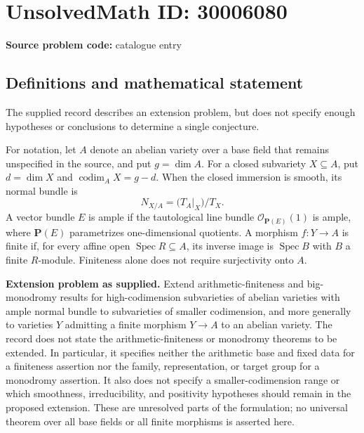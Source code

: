\documentclass[11pt]{article}
\begin{document}
\section*{UnsolvedMath ID: 30006080}
\textbf{Source problem code:} catalogue entry
\subsection{Definitions and mathematical statement}
The supplied record describes an extension problem, but does not specify enough hypotheses or conclusions to determine a single conjecture.

For notation, let \(A\) denote an abelian variety over a base field that remains unspecified in the source, and put \(g=\dim A\). For a closed subvariety \(X\subseteq A\), put \(d=\dim X\) and \(\operatorname{codim}_A X=g-d\). When the closed immersion is smooth, its normal bundle is
\[
N_{X/A}=\bigl(T_A|_X\bigr)/T_X.
\]
A vector bundle \(E\) is ample if the tautological line bundle \(\mathcal O_{\mathbf P(E)}(1)\) is ample, where \(\mathbf P(E)\) parametrizes one-dimensional quotients. A morphism \(f\colon Y\to A\) is finite if, for every affine open \(\operatorname{Spec}R\subseteq A\), its inverse image is \(\operatorname{Spec}B\) with \(B\) a finite \(R\)-module. Finiteness alone does not require surjectivity onto \(A\).

\textbf{Extension problem as supplied.} Extend arithmetic-finiteness and big-monodromy results for high-codimension subvarieties of abelian varieties with ample normal bundle to subvarieties of smaller codimension, and more generally to varieties \(Y\) admitting a finite morphism \(Y\to A\) to an abelian variety. The record does not state the arithmetic-finiteness or monodromy theorems to be extended. In particular, it specifies neither the arithmetic base and fixed data for a finiteness assertion nor the family, representation, or target group for a monodromy assertion. It also does not specify a smaller-codimension range or which smoothness, irreducibility, and positivity hypotheses should remain in the proposed extension. These are unresolved parts of the formulation; no universal theorem over all base fields or all finite morphisms is asserted here.
\end{document}
